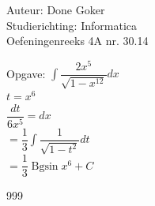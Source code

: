\documentclass[a4paper]{article}
\begin{document}
  
\noindent \large Auteur: Done Goker \\
\noindent \large Studierichting: Informatica\\
\noindent \large Oefeningenreeks 4A nr. 30.14\\

\medskip

\normalsize

Opgave:
$\displaystyle\int \dfrac{2x^5}{\sqrt{1-x^{12}}} dx$ \\

$t = x^6$ \\

$ \dfrac{dt}{6x^5}  = dx$ \\

$= \dfrac{1}{3}\displaystyle\int \dfrac{1}{\sqrt{1-t^{2}}}dt $ \\

$=\dfrac{1}{3} \operatorname{Bgsin} x^6 + C$

\begin{thebibliography}{999}
\end{thebibliography}
\end{document}
